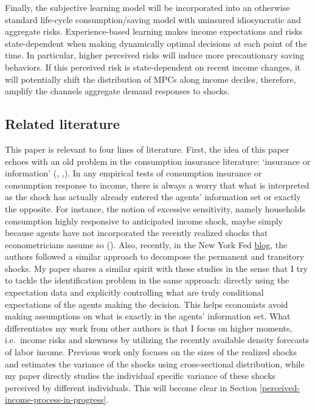\documentclass[12pt,notitlepage,onecolumn,aps,pra]{article}
\begin{document}
Finally, the subjective learning model will be incorporated into an
otherwise standard life-cycle consumption/saving model with uninsured
idiosyncratic and aggregate risks. Experience-based learning makes
income expectations and risks state-dependent when making dynamically
optimal decisions at each point of the time. In particular, higher
perceived risks will induce more precautionary saving behaviors. If this
perceived risk is state-dependent on recent income changes, it will
potentially shift the distribution of MPCs along income deciles,
therefore, amplify the channels aggregate demand responses to shocks.

\hypertarget{related-literature}{%
\subsection{Related literature}\label{related-literature}}

This paper is relevant to four lines of literature. First, the idea of
this paper echoes with an old problem in the consumption insurance
literature: `insurance or information' (\cite{pistaferri_superior_2001},
\cite{kaufmann_disentangling_2009},\cite{meghir2011earnings}). In any
empirical tests of consumption insurance or consumption response to
income, there is always a worry that what is interpreted as the shock
has actually already entered the agents' information set or exactly the
opposite. For instance, the notion of excessive sensitivity, namely
households consumption highly responsive to anticipated income shock,
maybe simply because agents have not incorporated the recently realized
shocks that econometricians assume so (\cite{flavin_excess_1988}). Also,
recently, in the New York Fed
\href{https://libertystreeteconomics.newyorkfed.org/2017/11/understanding-permanent-and-temporary-income-shocks.html}{blog},
the authors followed a similar approach to decompose the permanent and
transitory shocks. My paper shares a similar spirit with these studies
in the sense that I try to tackle the identification problem in the same
approach: directly using the expectation data and explicitly controlling
what are truly conditional expectations of the agents making the
decision. This helps economists avoid making assumptions on what is
exactly in the agents' information set. What differentiates my work from
other authors is that I focus on higher moments, i.e.~income risks and
skewness by utilizing the recently available density forecasts of labor
income. Previous work only focuses on the sizes of the realized shocks
and estimates the variance of the shocks using cross-sectional
distribution, while my paper directly studies the individual specific
variance of these shocks perceived by different individuals. This will
become clear in Section \ref{perceived-income-process-in-progress}.
\end{document}
